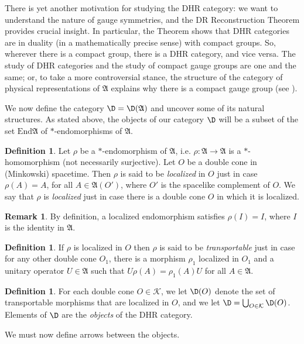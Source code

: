 \documentclass[12pt]{article}
\newcommand{\alg}[1]{\mathfrak{#1}}
\theoremstyle{definition}
\theoremstyle{definition}
\newtheorem{defn}[thm]{Definition}
\newtheorem{note}[thm]{Remark}
\theoremstyle{remark}
\def\2#1{{\mathcal #1}}
\def\al#1{{\mathfrak #1}}
\newcommand{\End}{\mathrm{End}}
\begin{document}
There is yet another motivation for studying the DHR category: we want
to understand the nature of gauge symmetries, and the DR
Reconstruction Theorem provides crucial insight.  In particular, the
Theorem shows that DHR categories are in duality (in a mathematically
precise sense) with compact groups.  So, wherever there is a compact
group, there is a DHR category, and vice versa.  The study of DHR
categories and the study of compact gauge groups are one and the same;
or, to take a more controversial stance, the structure of the category
of physical representations of $\al A$ explains why there is a compact
gauge group (see \cite{rob7}).

We now define the category $\D = \D (\al A)$ and uncover some of its
natural structures.  As stated above, the objects of our category $\D$
will be a subset of the set $\End \al A$ of $*$-endomorphisms of $\al
A$.

\begin{defn} Let $\rho$ be a $*$-endomorphism of $\al
  A$, i.e. $\rho :\al A\to \al A$ is a $*$-homomorphism
  (not necessarily surjective).  Let $O$ be a double
  cone in (Minkowski) spacetime.  Then $\rho$ is said
  to be \emph{localized} in $O$ just in case $\rho
  (A)=A$, for all $A\in \al A(O')$, where $O'$ is the
  spacelike complement of $O$.  We say that $\rho$ is
  \emph{localized} just in case there is a double cone
  $O$ in which it is localized.
\end{defn}

\begin{note} By definition, a localized endomorphism satisfies $\rho (I)=I$, where
  $I$ is the identity in $\alg{A}$. \end{note}

\begin{defn} If $\rho$ is localized in $O$ then $\rho$ is said to be
  \emph{transportable} just in case for any other double cone $O_1$, there is a
  morphism $\rho _1$ localized in $O_1$ and a unitary operator $U\in \alg{A}$ such
  that $U\rho (A)=\rho _1(A)U$ for all $A\in \alg{A}$.
\end{defn}

\begin{defn} For each double cone $O\in \2K$, we let $\D (O)$ denote the set of
  transportable morphisms that are localized in $O$, and we let $\D = \bigcup _{O\in
    \2K}\D (O)$.  Elements of $\D$ are the \emph{objects} of the DHR category.
\end{defn}

We must now define arrows between the objects.
\end{document}
